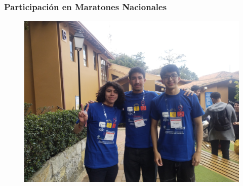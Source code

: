 \documentclass[17pt, t, lualatex]{beamer}
\begin{document}
\begin{frame}
  \frametitle{Participación en Maratones Nacionales}
  \begin{figure}
    \centering
    \includegraphics[height=0.95\textheight]{img/Maraton.jpg}
  \end{figure}
\end{frame}
\end{document}
